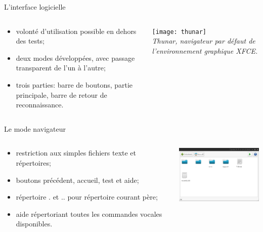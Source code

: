 \documentclass{beamer}
\begin{document}
\begin{frame}{L'interface logicielle}

	
	\begin{columns}[c]
	
	\begin{column}{5cm}
	\begin{itemize}
		\item volonté d'utilisation possible en dehors des tests;
		\item deux modes développées, avec passage transparent de l'un à l'autre;
		\item trois parties: barre de boutons, partie principale, barre de retour de reconnaissance.
	\end{itemize}
  	\end{column}
	\begin{column}{5cm}
		\texttt{[image: thunar]}\\
		\emph{\small Thunar, navigateur par défaut de l'environnement graphique XFCE.}
  	\end{column}
  	
  	\normalsize
	
	\end{columns}

\end{frame}

\begin{frame}{Le mode navigateur}

	\begin{columns}[c]
	
	\begin{column}{5cm}
	\begin{itemize}
		\item restriction aux simples fichiers texte et répertoires;
		\item boutons précédent, accueil, test et aide;
		\item répertoire . et .. pour répertoire courant père;
		\item aide répertoriant toutes les commandes vocales disponibles.
	\end{itemize}
  	\end{column}
	\begin{column}{5cm}
		\includegraphics[width=5cm]{explorer}\\
  	\end{column}
  	
  	\normalsize
	
	\end{columns}

\end{frame}
\end{document}
